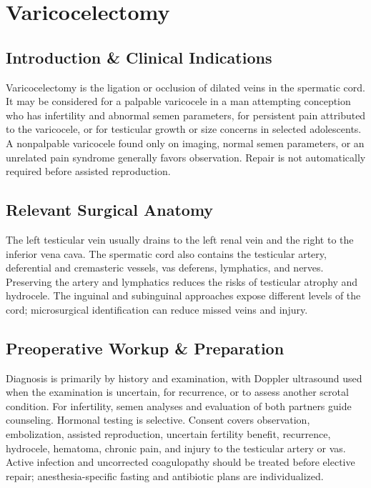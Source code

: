 \chapter{Varicocelectomy}

\section*{Introduction \& Clinical Indications}
Varicocelectomy is the ligation or occlusion of dilated veins in the spermatic cord. It may be considered for a palpable varicocele in a man attempting conception who has infertility and abnormal semen parameters, for persistent pain attributed to the varicocele, or for testicular growth or size concerns in selected adolescents. A nonpalpable varicocele found only on imaging, normal semen parameters, or an unrelated pain syndrome generally favors observation. Repair is not automatically required before assisted reproduction.

\section*{Relevant Surgical Anatomy}
The left testicular vein usually drains to the left renal vein and the right to the inferior vena cava. The spermatic cord also contains the testicular artery, deferential and cremasteric vessels, vas deferens, lymphatics, and nerves. Preserving the artery and lymphatics reduces the risks of testicular atrophy and hydrocele. The inguinal and subinguinal approaches expose different levels of the cord; microsurgical identification can reduce missed veins and injury.

\section*{Preoperative Workup \& Preparation}
Diagnosis is primarily by history and examination, with Doppler ultrasound used when the examination is uncertain, for recurrence, or to assess another scrotal condition. For infertility, semen analyses and evaluation of both partners guide counseling. Hormonal testing is selective. Consent covers observation, embolization, assisted reproduction, uncertain fertility benefit, recurrence, hydrocele, hematoma, chronic pain, and injury to the testicular artery or vas. Active infection and uncorrected coagulopathy should be treated before elective repair; anesthesia-specific fasting and antibiotic plans are individualized.

